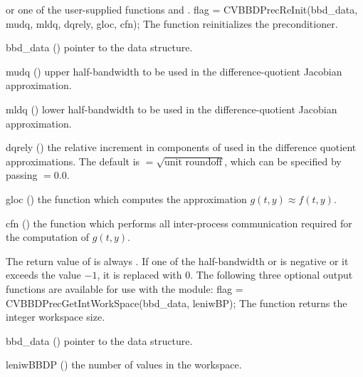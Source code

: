 or one of the user-supplied functions  and .
{
  flag = CVBBDPrecReInit(bbd\_data, mudq, mldq, dqrely, gloc, cfn);
}
{
  The function  reinitializes the {\cvbbdpre} preconditioner.
}
{
  \begin{args}
  \item[bbd\_data] ()
    pointer to the {\cvbbdpre} data structure.
  \item[mudq] ()
    upper half-bandwidth to be used in the difference-quotient Jacobian approximation.
  \item[mldq] ()
    lower half-bandwidth to be used in the difference-quotient Jacobian approximation.
  \item[dqrely] ()
    the relative increment in components of  used in the difference quotient
    approximations.  The default is  $= \sqrt{\text{unit roundoff}}$, which
    can be specified by passing  $= 0.0$.
  \item[gloc] ()
    the {\C} function which computes the approximation $g(t,y) \approx f(t,y)$. 
  \item[cfn] ()
    the {\C} function which performs all inter-process communication required for
    the computation of $g(t,y)$.
  \end{args}
}
{
  The return value of  is always .
}
{
  If one of the half-bandwidth  or  is negative or it
  exceeds the value $-1$, it is replaced with 0.
}
The following three optional output functions are available for use with
the {\cvbbdpre} module:
{
  flag = CVBBDPrecGetIntWorkSpace(bbd\_data, leniwBP);
}
{
  The function  returns the
  {\cvbbdpre} integer workspace size.
}
{
  \begin{args}[leniwBBDP]
  \item[bbd\_data] ()
    pointer to the {\cvbbdpre} data structure.
  \item[leniwBBDP] ()
    the number of  values in the {\cvbbdpre} workspace.
  \end{args}
}
